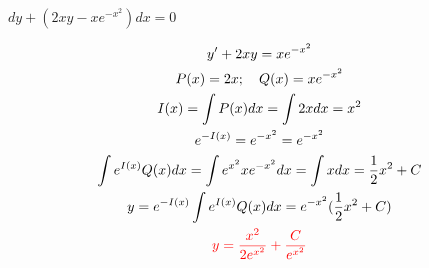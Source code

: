\item [3.] $dy + (2xy - xe^{-x^2}) dx = 0$

\textcolor{blue}{
    \begin{gather*}
        y'+2xy=xe^{-x^2}\\
        P(x)=2x; \quad Q(x)=xe^{-x^2}\\
        I(x)=\int P(x)dx = \int 2xdx=x^2\\
        e^{-I(x)}=e^{-x^2}=e^{-x^2}\\
        \int e^{I(x)}Q(x)dx=\int e^{x^2}xe^{-x^2}dx=\int xdx=\frac{1}{2}x^2+C\\
        y=e^{-I(x)}\int e^{I(x)}Q(x)dx=e^{-x^2}(\frac{1}{2}x^2+C)\\
        \textcolor{red}{
        y=\frac{x^2}{2e^{x^2}}+\frac{C}{e^{x^2}}  
        }
    \end{gather*}
}